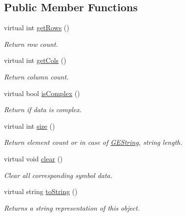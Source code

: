 \subsection*{Public Member Functions}
\begin{DoxyCompactItemize}
\item 
virtual int \hyperlink{class_g_e_symbol_a3f12da45e65b190ccca3601ffe513c6c}{get\-Rows} ()
\begin{DoxyCompactList}\small\item\em Return row count. \end{DoxyCompactList}\item 
virtual int \hyperlink{class_g_e_symbol_a56c400ba8211b292bab8d67816d0e04d}{get\-Cols} ()
\begin{DoxyCompactList}\small\item\em Return column count. \end{DoxyCompactList}\item 
virtual bool \hyperlink{class_g_e_symbol_aece6cf0d25baffbad8059d36f19a691e}{is\-Complex} ()
\begin{DoxyCompactList}\small\item\em Return if data is complex. \end{DoxyCompactList}\item 
virtual int \hyperlink{class_g_e_symbol_a706a39fc819e1c27e0d92d42c2bebcf6}{size} ()
\begin{DoxyCompactList}\small\item\em Return element count or in case of \hyperlink{class_g_e_string}{G\-E\-String}, string length. \end{DoxyCompactList}\item 
virtual void \hyperlink{class_g_e_symbol_a39d2e523aec771a73e1cc5d7a9618b88}{clear} ()
\begin{DoxyCompactList}\small\item\em Clear all corresponding symbol data. \end{DoxyCompactList}\item 
virtual string \hyperlink{class_g_e_symbol_a6790ac75620cc1a9e37d67279e8bd4d1}{to\-String} ()
\begin{DoxyCompactList}\small\item\em Returns a string representation of this object. \end{DoxyCompactList}\end{DoxyCompactItemize}
